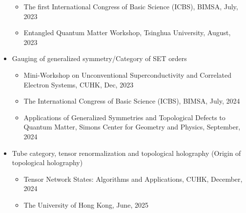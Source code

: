 \documentclass[hidelinks,a4paper]{article}
\begin{document}
\begin{itemize}
\begin{itemize}
     \item  The first International Congress of Basic Science (ICBS), BIMSA, July, 2023
     \item  Entangled Quantum Matter Workshop, Tsinghua University, August, 2023
  \end{itemize}
  \item Gauging of generalized symmetry/Category of SET orders~\supercite{LYW2312.15958}
  \begin{itemize}\small
    \item  Mini-Workshop on Unconventional Superconductivity and Correlated Electron Systems, CUHK, Dec, 2023
    \item  The International Congress of Basic Science (ICBS), BIMSA, July, 2024
    \item  Applications of Generalized Symmetries and Topological Defects to Quantum Matter, Simons Center for Geometry and Physics, September, 2024 
  \end{itemize}
  \item Tube category, tensor renormalization and topological holography (Origin of topological holography)~\supercite{Lan2412.07198}
  \begin{itemize}\small
    \item Tensor Network States: Algorithms and Applications, CUHK, December, 2024
    \item The University of Hong Kong, June, 2025
  \end{itemize}
  
\end{itemize}

\printbibliography[title=Publications]
\end{document}
